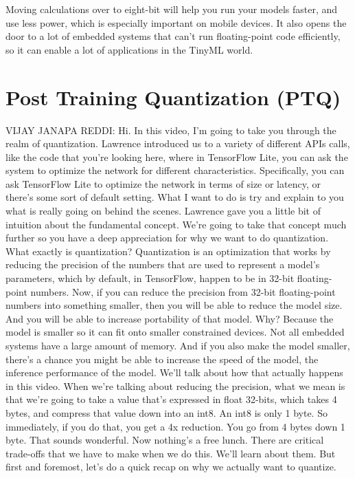 Moving calculations over to eight-bit will help you run your models faster, and use less power, which is especially important on mobile devices. It also opens the door to a lot of embedded systems that can’t run floating-point code efficiently, so it can enable a lot of applications in the TinyML world.

\section{Post Training Quantization (PTQ)}

VIJAY JANAPA REDDI: Hi.
In this video, I'm going to take you through the realm of quantization.
Lawrence introduced us to a variety of different APIs calls,
like the code that you're looking here, where in TensorFlow Lite,
you can ask the system to optimize the network for different characteristics.
Specifically, you can ask TensorFlow Lite
to optimize the network in terms of size or latency,
or there's some sort of default setting.
What I want to do is try and explain to you what
is really going on behind the scenes.
Lawrence gave you a little bit of intuition
about the fundamental concept.
We're going to take that concept much further so you have a deep appreciation
for why we want to do quantization.
What exactly is quantization?
Quantization is an optimization that works
by reducing the precision of the numbers that
are used to represent a model's parameters, which
by default, in TensorFlow, happen to be in 32-bit floating-point numbers.
Now, if you can reduce the precision from 32-bit floating-point numbers
into something smaller, then you will be able to reduce the model size.
And you will be able to increase portability of that model.
Why?
Because the model is smaller so it can fit onto smaller constrained devices.
Not all embedded systems have a large amount of memory.
And if you also make the model smaller, there's
a chance you might be able to increase the speed of the model,
the inference performance of the model.
We'll talk about how that actually happens in this video.
When we're talking about reducing the precision, what we mean
is that we're going to take a value that's
expressed in float 32-bits, which takes 4 bytes,
and compress that value down into an int8.
An int8 is only 1 byte.
So immediately, if you do that, you get a 4x reduction.
You go from 4 bytes down 1 byte.
That sounds wonderful.
Now nothing's a free lunch.
There are critical trade-offs that we have to make when we do this.
We'll learn about them.
But first and foremost, let's do a quick recap
on why we actually want to quantize.
